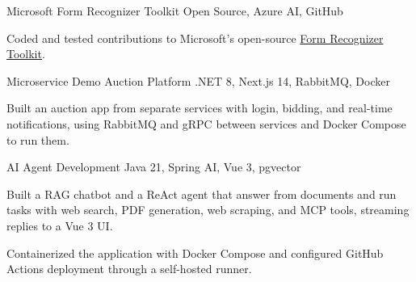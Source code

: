 


\resumeProject
  {Microsoft Form Recognizer Toolkit}
  {Open Source, Azure AI, GitHub}
  {}
  {
    \item Coded and tested contributions to Microsoft's open-source \href{https://github.com/microsoft/Form-Recognizer-Toolkit}{Form Recognizer Toolkit}.
  }

\resumeProject
  {Microservice Demo Auction Platform}
  {.NET 8, Next.js 14, RabbitMQ, Docker}
  {}
  {
    \item Built an auction app from separate services with login, bidding, and real-time notifications, using RabbitMQ and gRPC between services and Docker Compose to run them.
  }

\resumeProject
  {AI Agent Development}
  {Java 21, Spring AI, Vue 3, pgvector}
  { \textbar\ }
  {
    \item Built a RAG chatbot and a ReAct agent that answer from documents and run tasks with web search, PDF generation, web scraping, and MCP tools, streaming replies to a Vue 3 UI.
    \item Containerized the application with Docker Compose and configured GitHub Actions deployment through a self-hosted runner.
  }

